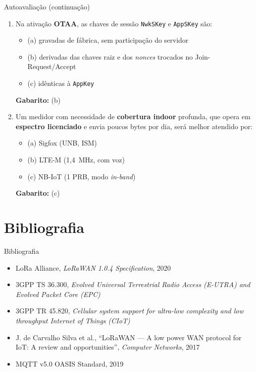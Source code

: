 \documentclass[aspectratio=169,11pt]{beamer}
\begin{document}
\begin{frame}{Autoavaliação (continuação)}
  \begin{enumerate}
    \item Na ativação \textbf{OTAA}, as chaves de sessão \texttt{NwkSKey} e \texttt{AppSKey} são:
      \begin{itemize}
        \item (a) gravadas de fábrica, sem participação do servidor
        \item (b) derivadas das chaves raiz e dos \emph{nonces} trocados no Join-Request/Accept
        \item (c) idênticas à \texttt{AppKey}
      \end{itemize}
      \pause
      \textbf{Gabarito:} (b)
    \item Um medidor com necessidade de \textbf{cobertura indoor} profunda, que opera em \textbf{espectro licenciado} e envia poucos bytes por dia, será melhor atendido por:
      \begin{itemize}
        \item (a) Sigfox (UNB, ISM)
        \item (b) LTE-M (1,4~MHz, com voz)
        \item (c) NB-IoT (1 PRB, modo \emph{in-band})
      \end{itemize}
      \pause
      \textbf{Gabarito:} (c)
  \end{enumerate}
\end{frame}

\section{Bibliografia}

\begin{frame}{Bibliografia}
  \begin{itemize}
    \item LoRa Alliance, \emph{LoRaWAN 1.0.4 Specification}, 2020
    \item 3GPP TS 36.300, \emph{Evolved Universal Terrestrial Radio Access (E-UTRA) and Evolved Packet Core (EPC)}
    \item 3GPP TR 45.820, \emph{Cellular system support for ultra-low complexity and low throughput Internet of Things (CIoT)}
    \item J. de Carvalho Silva et al., ``LoRaWAN --- A low power WAN protocol for IoT: A review and opportunities'', \emph{Computer Networks}, 2017
    \item MQTT v5.0 OASIS Standard, 2019
  \end{itemize}
\end{frame}
\end{document}
